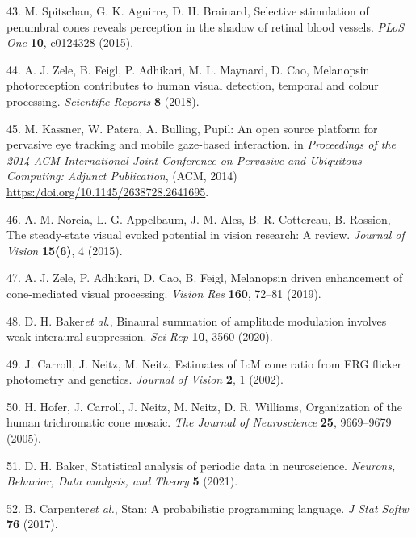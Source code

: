 \documentclass[
]{article}
\begin{document}
\leavevmode\hypertarget{ref-Spitschan2015}{}%
43. M. Spitschan, G. K. Aguirre, D. H. Brainard, Selective stimulation of penumbral cones reveals perception in the shadow of retinal blood vessels. \emph{PLoS One} \textbf{10}, e0124328 (2015).

\leavevmode\hypertarget{ref-Zele2018}{}%
44. A. J. Zele, B. Feigl, P. Adhikari, M. L. Maynard, D. Cao, Melanopsin photoreception contributes to human visual detection, temporal and colour processing. \emph{Scientific Reports} \textbf{8} (2018).

\leavevmode\hypertarget{ref-Kassner2014}{}%
45. M. Kassner, W. Patera, A. Bulling, Pupil: An open source platform for pervasive eye tracking and mobile gaze-based interaction. in \emph{Proceedings of the 2014 ACM International Joint Conference on Pervasive and Ubiquitous Computing: Adjunct Publication}, (ACM, 2014) \url{https:/doi.org/10.1145/2638728.2641695}.

\leavevmode\hypertarget{ref-Norcia2015}{}%
46. A. M. Norcia, L. G. Appelbaum, J. M. Ales, B. R. Cottereau, B. Rossion, The steady-state visual evoked potential in vision research: A review. \emph{Journal of Vision} \textbf{15(6)}, 4 (2015).

\leavevmode\hypertarget{ref-Zele2019}{}%
47. A. J. Zele, P. Adhikari, D. Cao, B. Feigl, Melanopsin driven enhancement of cone-mediated visual processing. \emph{Vision Res} \textbf{160}, 72--81 (2019).

\leavevmode\hypertarget{ref-Baker2020}{}%
48. D. H. Baker\emph{et al.}, Binaural summation of amplitude modulation involves weak interaural suppression. \emph{Sci Rep} \textbf{10}, 3560 (2020).

\leavevmode\hypertarget{ref-Carroll2002}{}%
49. J. Carroll, J. Neitz, M. Neitz, Estimates of L:M cone ratio from ERG flicker photometry and genetics. \emph{Journal of Vision} \textbf{2}, 1 (2002).

\leavevmode\hypertarget{ref-Hofer2005}{}%
50. H. Hofer, J. Carroll, J. Neitz, M. Neitz, D. R. Williams, Organization of the human trichromatic cone mosaic. \emph{The Journal of Neuroscience} \textbf{25}, 9669--9679 (2005).

\leavevmode\hypertarget{ref-Baker2021}{}%
51. D. H. Baker, Statistical analysis of periodic data in neuroscience. \emph{Neurons, Behavior, Data analysis, and Theory} \textbf{5} (2021).

\leavevmode\hypertarget{ref-Carpenter2017}{}%
52. B. Carpenter\emph{et al.}, Stan: A probabilistic programming language. \emph{J Stat Softw} \textbf{76} (2017).
\end{document}
